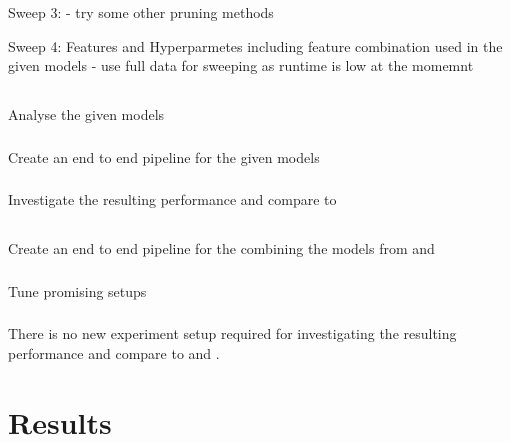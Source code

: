 \documentclass[a4paper]{article}
\begin{document}
    Sweep 3:
    - try some other pruning methods

    Sweep 4: Features and Hyperparmetes including feature combination used in the given models
    - use full data for sweeping as runtime is low at the momemnt


    \subsection*{}
    \subsubsection*{} Analyse the given models
    \subsubsection*{} Create an end to end pipeline for the given models
    \subsubsection*{} Investigate the resulting performance and compare to 

    \subsection*{}
    \subsubsection*{} Create an end to end pipeline for the combining the models from  and 
    \subsubsection*{} Tune promising setups
    \subsubsection*{}
    There is no new experiment setup required for investigating the resulting performance and compare to  and .



    \section{Results}\label{sec:results}
\end{document}
